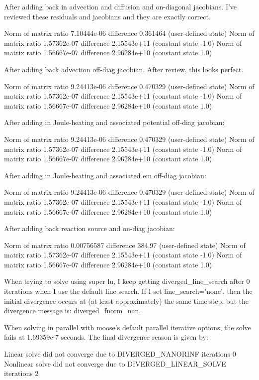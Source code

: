 After adding back in advection and diffusion and on-diagonal jacobians. I've reviewed these residuals and jacobians and they are exactly correct.

Norm of matrix ratio 7.10444e-06 difference 0.361464 (user-defined state)
Norm of matrix ratio 1.57362e-07 difference 2.15543e+11 (constant state -1.0)
Norm of matrix ratio 1.56667e-07 difference 2.96284e+10 (constant state 1.0)

After adding back advection off-diag jacobian. After review, this looks perfect.

Norm of matrix ratio 9.24413e-06 difference 0.470329 (user-defined state)
Norm of matrix ratio 1.57362e-07 difference 2.15543e+11 (constant state -1.0)
Norm of matrix ratio 1.56667e-07 difference 2.96284e+10 (constant state 1.0)

After adding in Joule-heating and associated potential off-diag jacobian:

Norm of matrix ratio 9.24413e-06 difference 0.470329 (user-defined state)
Norm of matrix ratio 1.57362e-07 difference 2.15543e+11 (constant state -1.0)
Norm of matrix ratio 1.56667e-07 difference 2.96284e+10 (constant state 1.0)

After adding in Joule-heating and associated em off-diag jacobian:

Norm of matrix ratio 9.24413e-06 difference 0.470329 (user-defined state)
Norm of matrix ratio 1.57362e-07 difference 2.15543e+11 (constant state -1.0)
Norm of matrix ratio 1.56667e-07 difference 2.96284e+10 (constant state 1.0)

After adding back reaction source and on-diag jacobian:

Norm of matrix ratio 0.00756587 difference 384.97 (user-defined state)
Norm of matrix ratio 1.57362e-07 difference 2.15543e+11 (constant state -1.0)
Norm of matrix ratio 1.56667e-07 difference 2.96284e+10 (constant state 1.0)

When trying to solve using super lu, I keep getting diverged_line_search after 0 iterations when I use the default line search. If I set line_search='none', then the initial divergence occurs at (at least approximately) the same time step, but the divergence message is: diverged_fnorm_nan.

When solving in parallel with moose's default parallel iterative options, the solve fails at 1.69359e-7 seconds. The final divergence reason is given by:

  Linear solve did not converge due to DIVERGED_NANORINF iterations 0
Nonlinear solve did not converge due to DIVERGED_LINEAR_SOLVE iterations 2

